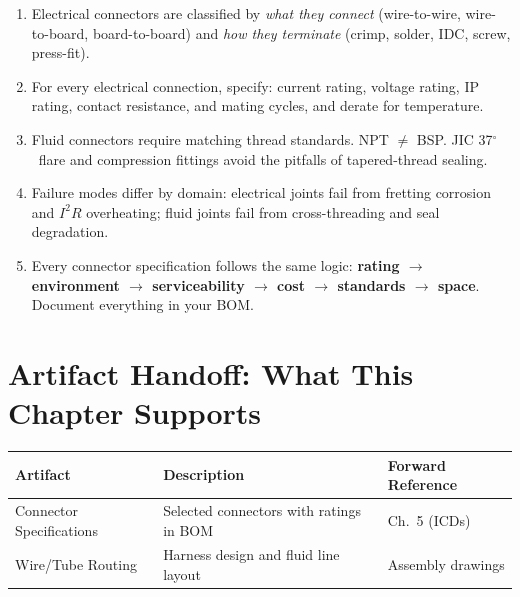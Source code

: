 \documentclass[11pt,letterpaper,twoside,openany]{book}
\begin{document}
\begin{keyconceptbox}
\begin{enumerate}[nosep,leftmargin=1.5em]
  \item Electrical connectors are classified by \emph{what they connect} (wire-to-wire, wire-to-board, board-to-board) and \emph{how they terminate} (crimp, solder, IDC, screw, press-fit).
  \item For every electrical connection, specify: current rating, voltage rating, IP rating, contact resistance, and mating cycles, and derate for temperature.
  \item Fluid connectors require matching thread standards. NPT $\neq$ BSP. JIC 37$^{\circ}$\ flare and compression fittings avoid the pitfalls of tapered-thread sealing.
  \item Failure modes differ by domain: electrical joints fail from fretting corrosion and $I^2R$ overheating; fluid joints fail from cross-threading and seal degradation.
  \item Every connector specification follows the same logic: \textbf{rating $\to$ environment $\to$ serviceability $\to$ cost $\to$ standards $\to$ space}. Document everything in your BOM.
\end{enumerate}
\end{keyconceptbox}


\section{Artifact Handoff: What This Chapter Supports}
\begin{table}[htbp]\centering\small
\begin{tabularx}{\textwidth}{l X l}
\toprule
\textbf{Artifact} & \textbf{Description} & \textbf{Forward Reference} \\
\midrule
Connector Specifications & Selected connectors with ratings in BOM & Ch.~5 (ICDs) \\
Wire/Tube Routing & Harness design and fluid line layout & Assembly drawings \\
\bottomrule
\end{tabularx}
\end{table}
\end{document}
